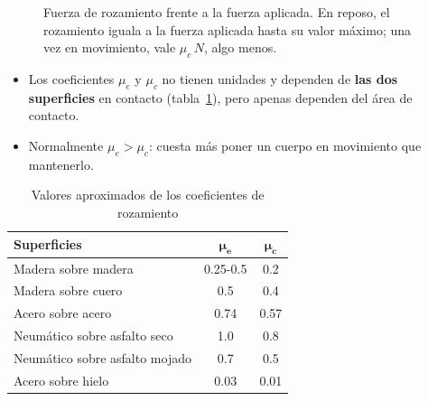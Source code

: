 \begin{figure}[H]
    \centering
    \caption{Fuerza de rozamiento frente a la fuerza aplicada. En reposo, el rozamiento iguala a la fuerza aplicada hasta su valor
    máximo; una vez en movimiento, vale \(\mu_c\,N\), algo menos.}
    \label{fig:ud11-rozamiento}
\end{figure}

\begin{itemize}
    \item Los coeficientes \(\mu_e\) y \(\mu_c\) no tienen unidades y dependen de \textbf{las dos superficies} en contacto
    (tabla~\ref{tab:ud11-coeficientes}), pero apenas dependen del área de contacto.
    \item Normalmente \(\mu_e > \mu_c\): cuesta más poner un cuerpo en movimiento que mantenerlo.
\end{itemize}

\begin{table}[H]
    \centering
    \caption{Valores aproximados de los coeficientes de rozamiento}
    \vspace{-5pt}
    \begin{tabular}{@{}lcc@{}}
        \toprule
        \textbf{Superficies} & \(\boldsymbol{\mu_e}\) & \(\boldsymbol{\mu_c}\) \\
        \midrule
        Madera sobre madera & \num{0.25}-\num{0.5} & \num{0.2} \\[3pt]
        Madera sobre cuero & \num{0.5} & \num{0.4} \\[3pt]
        Acero sobre acero & \num{0.74} & \num{0.57} \\[3pt]
        Neumático sobre asfalto seco & \num{1.0} & \num{0.8} \\[3pt]
        Neumático sobre asfalto mojado & \num{0.7} & \num{0.5} \\[3pt]
        Acero sobre hielo & \num{0.03} & \num{0.01} \\
        \bottomrule
    \end{tabular}
    \label{tab:ud11-coeficientes}
\end{table}

